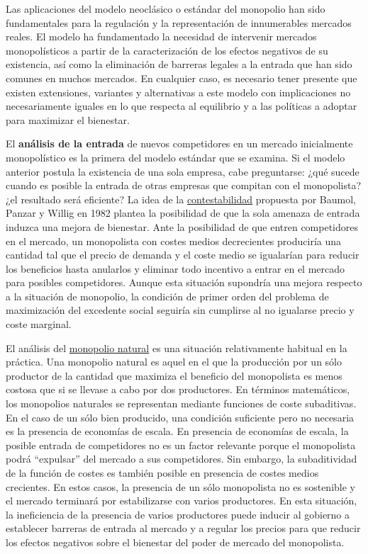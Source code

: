 \documentclass{nuevotema}
\begin{document}
Las aplicaciones del modelo neoclásico o estándar del monopolio han sido fundamentales para la regulación y la representación de innumerables mercados reales. El modelo ha fundamentado la necesidad de intervenir mercados monopolísticos a partir de la caracterización de los efectos negativos de su existencia, así como la eliminación de barreras legales a la entrada que han sido comunes en muchos mercados. En cualquier caso, es necesario tener presente que existen extensiones, variantes y alternativas a este modelo con implicaciones no necesariamente iguales en lo que respecta al equilibrio y a las políticas a adoptar para maximizar el bienestar.

El \textbf{análisis de la entrada} de nuevos competidores en un mercado inicialmente monopolístico es la primera  del modelo estándar que se examina. Si el modelo anterior postula la existencia de una sola empresa, cabe preguntarse: ¿qué sucede cuando es posible la entrada de otras empresas que compitan con el monopolista? ¿el resultado será eficiente? La idea de la \underline{contestabilidad} propuesta por Baumol, Panzar y Willig en 1982 plantea la posibilidad de que la sola amenaza de entrada induzca una mejora de bienestar. Ante la posibilidad de que entren competidores en el mercado, un monopolista con costes medios decrecientes produciría una cantidad tal que el precio de demanda y el coste medio se igualarían para reducir los beneficios hasta anularlos y eliminar todo incentivo a entrar en el mercado para posibles competidores. Aunque esta situación supondría una mejora respecto a la situación de monopolio, la condición de primer orden del problema de maximización del excedente social seguiría sin cumplirse al no igualarse precio y coste marginal.

El análisis del \underline{monopolio natural} es una situación relativamente habitual en la práctica. Una monopolio natural es aquel en el que la producción por un sólo productor de la cantidad que maximiza el beneficio del monopolista es menos costosa que si se llevase a cabo por dos productores. En términos matemáticos, los monopolios naturales se representan mediante funciones de coste subaditivas. En el caso de un sólo bien producido, una condición suficiente pero no necesaria es la presencia de economías de escala. En presencia de economías de escala, la posible entrada de competidores no es un factor relevante porque el monopolista podrá ``expulsar'' del mercado a sus competidores. Sin embargo, la subaditividad de la función de costes es también posible en presencia de costes medios crecientes. En estos casos, la presencia de un sólo monopolista no es sostenible y el mercado terminará por estabilizarse con varios productores. En esta situación, la ineficiencia de la presencia de varios productores puede inducir al gobierno a establecer barreras de entrada al mercado y a regular los precios para que reducir los efectos negativos sobre el bienestar del poder de mercado del monopolista.
\end{document}
